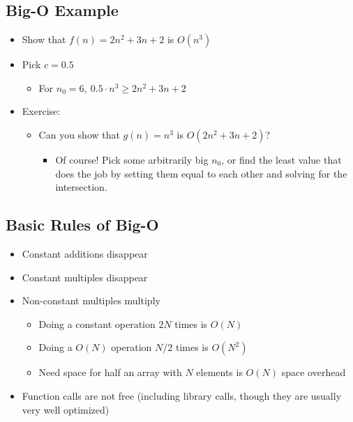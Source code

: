 \documentclass[10pt]{article}
\begin{document}
\subsection*{Big-O Example}
\begin{itemize}
\item Show that $f(n) = 2n^2 + 3n + 2$ is $O(n^3)$
\item Pick $c=0.5$
\begin{itemize}
\item For $n_0 = 6,\ 0.5\cdot n^3 \geq 2n^2 + 3n + 2$
\end{itemize}
\item Exercise:
\begin{itemize}
\item Can you show that $g(n) = n^3$ is $O(2n^2+3n+2)$?
\begin{itemize}
    \item Of course! Pick some arbitrarily big $n_0$, or find the least value that does the job by setting them equal to each other and solving for the intersection.
\end{itemize}
\end{itemize}
\end{itemize}

\subsection*{Basic Rules of Big-O}
\begin{itemize}
\item Constant additions disappear
\item Constant multiples disappear
\item Non-constant multiples multiply
\begin{itemize}
\item Doing a constant operation $2N$ times is $O(N)$
\item Doing a $O(N)$ operation $N/2$ times is $O(N^2)$
\item Need space for half an array with $N$ elements is $O(N)$ space overhead
\end{itemize}
\item Function calls are not free (including library calls, though they are usually very well optimized)
\end{itemize}
\end{document}
